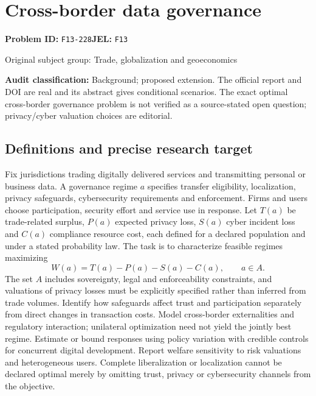 \documentclass[11pt,a4paper]{article}
\begin{document}
\section*{Cross-border data governance}
\textbf{Problem ID:} \texttt{F13-228}\quad \textbf{JEL:} \texttt{F13}\par
\label{problem:OP-0347}
{\sffamily\small\color{muted}Original subject group: Trade, globalization and geoeconomics\par}
\label{definitions:problem:30007629}
\textbf{Audit classification:} Background; proposed extension. The official report and DOI are real and its abstract gives conditional scenarios. The exact optimal cross-border governance problem is not verified as a source-stated open question; privacy/cyber valuation choices are editorial.
\subsection*{Definitions and precise research target}
Fix jurisdictions trading digitally delivered services and transmitting personal or business data. A governance regime \(a\) specifies transfer eligibility, localization, privacy safeguards, cybersecurity requirements and enforcement. Firms and users choose participation, security effort and service use in response. Let \(T(a)\) be trade-related surplus, \(P(a)\) expected privacy loss, \(S(a)\) cyber incident loss and \(C(a)\) compliance resource cost, each defined for a declared population and under a stated probability law. The task is to characterize feasible regimes maximizing
\[W(a)=T(a)-P(a)-S(a)-C(a),\qquad a\in A.\]
The set \(A\) includes sovereignty, legal and enforceability constraints, and valuations of privacy losses must be explicitly specified rather than inferred from trade volumes. Identify how safeguards affect trust and participation separately from direct changes in transaction costs. Model cross-border externalities and regulatory interaction; unilateral optimization need not yield the jointly best regime. Estimate or bound responses using policy variation with credible controls for concurrent digital development. Report welfare sensitivity to risk valuations and heterogeneous users. Complete liberalization or localization cannot be declared optimal merely by omitting trust, privacy or cybersecurity channels from the objective.
\end{document}

